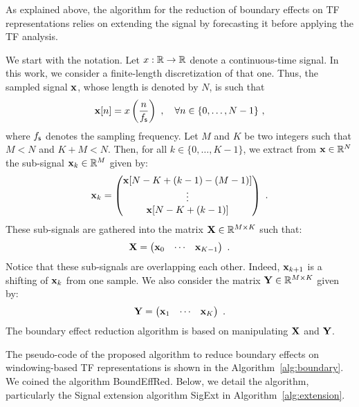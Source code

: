 As explained above, the algorithm for the reduction of boundary effects on TF representations relies on extending the signal by forecasting it before applying the TF analysis. 
%

We start with the notation. Let $x:{\mathbb R}\to{\mathbb R}$ denote a continuous-time signal. In this work, we consider a finite-length discretization of that one. Thus, the sampled signal ${\mathbf x}$, whose length is denoted by $N$, is such that
\[
\bx[n] = x\left(\frac{n}{\fs}\right)\ ,\quad \forall n\in\{0,\ldots,N-1\}\ , 
\]
where $f_{\mathsf s}$ denotes the sampling frequency. 
Let $M$ and $K$ be two integers such that $M<N$ and $K+M<N$. Then, for all $k\in\{0,\ldots,K-1\}$, we extract from ${\mathbf x}\in{\mathbb R}^N$ the sub-signal ${\mathbf x}_k\in{\mathbb R}^M$ given by:
\begin{equation}
\bx_k = 
\begin{pmatrix}
\bx[N-K+(k-1)-(M-1)] \\
\vdots \\
\bx[N-K+(k-1)]
\end{pmatrix}\ .
\label{eq:xk}
\end{equation} 
These sub-signals are gathered into the matrix ${\mathbf X}\in{\mathbb R}^{M\times K}$ such that:
\begin{equation*}
{\mathbf X} = 
\begin{pmatrix}
{\mathbf x}_0 & \cdots & {\mathbf x}_{K-1}
\end{pmatrix}\ .
\end{equation*}
Notice that these sub-signals are overlapping each other. Indeed, ${\mathbf x}_{k+1}$ is a shifting of ${\mathbf x}_k$ from one sample. We also consider the matrix ${\mathbf Y}\in{\mathbb R}^{M\times K}$ given by:
\begin{equation*}
{\mathbf Y} = 
\begin{pmatrix}
{\mathbf x}_1 & \cdots & {\mathbf x}_{K}
\end{pmatrix}\ .
\end{equation*}
The boundary effect reduction algorithm is based on manipulating ${\mathbf X}$ and ${\mathbf Y}$.

%
The pseudo-code of the proposed algorithm to reduce boundary effects on windowing-based TF representations is shown in the Algorithm~\ref{alg:boundary}. We coined the algorithm {\sf BoundEffRed}. Below, we detail the algorithm, particularly the Signal extension algorithm {\sf SigExt} in Algorithm~\ref{alg:extension}.


